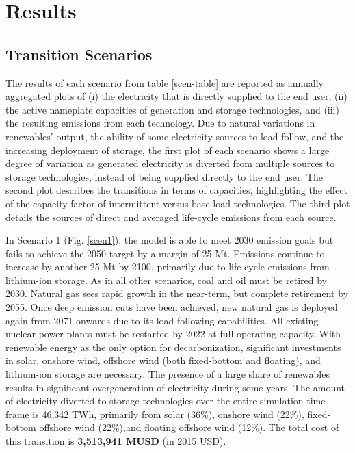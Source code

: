 \section{Results} \label{Results-and-discussion}

\subsection{Transition Scenarios}


The results of each scenario from table \ref{scen-table} are reported as annually aggregated plots of (i) the electricity that is directly supplied to the end user, (ii) the active nameplate capacities of generation and storage technologies, and (iii) the resulting emissions from each technology. Due to natural variations in renewables' output, the ability of some electricity sources to load-follow, and the increasing deployment of storage, the first plot of each scenario shows a large degree of variation as generated electricity is diverted from multiple sources to storage technologies, instead of being supplied directly to the end user. The second plot describes the transitions in terms of capacities, highlighting the effect of the capacity factor of intermittent versus base-load technologies. The third plot details the sources of direct and averaged life-cycle emissions from each source.

In Scenario 1 (Fig. \ref{scen1}), the model is able to meet 2030 emission goals but fails to achieve the 2050 target by a margin of 25 Mt. Emissions continue to increase by another 25 Mt by 2100, primarily due to life cycle emissions from lithium-ion storage. As in all other scenarios, coal and oil must be retired by 2030. Natural gas sees rapid growth in the near-term, but complete retirement by 2055. Once deep emission cuts have been achieved, new natural gas is deployed again from 2071 onwards due to its load-following capabilities. All existing nuclear power plants must be restarted by 2022 at full operating capacity. With renewable energy as the only option for decarbonization, significant investments in solar, onshore wind, offshore wind (both fixed-bottom and floating), and lithium-ion storage are necessary. The presence of a large share of renewables results in significant overgeneration of electricity during some years. The amount of electricity diverted to storage technologies over the entire simulation time frame is 46,342 TWh, primarily from solar (36\%), onshore wind (22\%), fixed-bottom offshore wind (22\%),and floating offshore wind (12\%). The total cost of this transition is \textbf{3,513,941 MUSD} (in 2015 USD).


